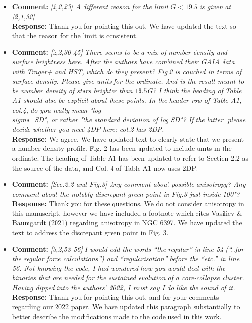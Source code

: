 \documentclass[aps,prl,reprint,showpacs,floatfix,superscriptaddress, onecolumn, 12pt]{revtex4-2}
\begin{document}
\begin{itemize}
    \item

    \textbf{Comment:} \textit{[2,2,23] A different reason for the limit $G < 19.5$ is given at
[2,1,32]}\\
    \textbf{Response:} Thank you for pointing this out. We have updated the text so that the reason for the limit is consistent.

    \item
    \textbf{Comment:} \textit{[2,2,30-45] There seems to be a mix of number density and surface
brightness here. After the authors have combined their GAIA data with
Trager+ and HST, which do they present? Fig.2 is couched in terms of
surface density. Please give units for the ordinate. And is the
result meant to be number density of stars brighter than $19.5$G? I
think the heading of Table A1 should also be explicit about these
points. In the header row of Table A1, col.4, do you really mean "log
\\sigma\_SD", or rather "the standard deviation of log SD"? If the
latter, please decide whether you need 4DP here; col.2 has 2DP.}\\
    \textbf{Response:} We agree. We have updated text to clearly state that we present a number density profile. Fig. 2 has been updated to include units in the ordinate. The heading of Table A1 has been updated to refer to Section 2.2 as the source of the data, and  Col. 4 of Table A1 now uses 2DP.

    \item
    \textbf{Comment:} \textit{[Sec.2.2 and Fig.3] Any comment about possible anisotropy? Any comment
about the notably discrepant green point in Fig.3 just inside 100"?}\\
    \textbf{Response:} Thank you for these questions. We do not consider anisotropy in this manuscript, however we have included a footnote which cites Vasiliev \& Baumgardt (2021) regarding anisotropy in NGC 6397. We have updated the text to address the discrepant green point in Fig. 3.

    \item
    \textbf{Comment:} \textit{[3,2,53-56] I would add the words ``the regular'' in line 54 (``..for the
regular force calculations'') and ``regularisation'' before the ``etc.'' in
line 56. Not knowing the code, I had wondered how you would deal with
the binaries that are needed for the sustained evolution of a
core-collapse cluster. Having dipped into the authors' 2022, I must
say I do like the sound of it.}\\
    \textbf{Response:} Thank you for pointing this out, and for your comments regarding our 2022 paper. We have updated this paragraph substantially to better describe the modifications made to the code used in this work.


\end{itemize}
\end{document}
